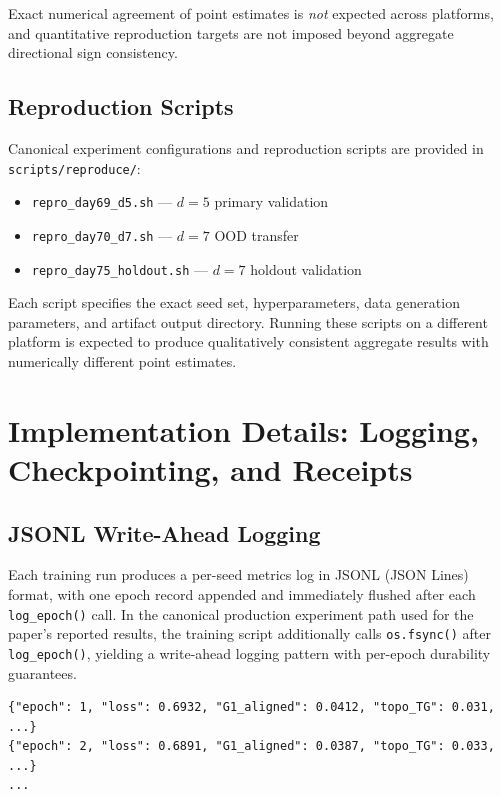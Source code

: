 Exact numerical agreement of point estimates is \emph{not} expected across platforms, and quantitative reproduction targets are not imposed beyond aggregate directional sign consistency.

\subsection{Reproduction Scripts}

Canonical experiment configurations and reproduction scripts are provided in \texttt{scripts/reproduce/}:

\begin{itemize}
\item \texttt{repro\_day69\_d5.sh} --- $d{=}5$ primary validation
\item \texttt{repro\_day70\_d7.sh} --- $d{=}7$ OOD transfer
\item \texttt{repro\_day75\_holdout.sh} --- $d{=}7$ holdout validation
\end{itemize}

Each script specifies the exact seed set, hyperparameters, data generation parameters, and artifact output directory. Running these scripts on a different platform is expected to produce qualitatively consistent aggregate results with numerically different point estimates.

\onecolumngrid
\section{Implementation Details: Logging, Checkpointing, and Receipts}
\label{app:impl}

\subsection{JSONL Write-Ahead Logging}

Each training run produces a per-seed metrics log in JSONL (JSON Lines) format, with one epoch record appended and immediately flushed after each \texttt{log\_epoch()} call. In the canonical production experiment path used for the paper's reported results, the training script additionally calls \texttt{os.fsync()} after \texttt{log\_epoch()}, yielding a write-ahead logging pattern with per-epoch durability guarantees.

\begin{lstlisting}
{"epoch": 1, "loss": 0.6932, "G1_aligned": 0.0412, "topo_TG": 0.031, ...}
{"epoch": 2, "loss": 0.6891, "G1_aligned": 0.0387, "topo_TG": 0.033, ...}
...
\end{lstlisting}

